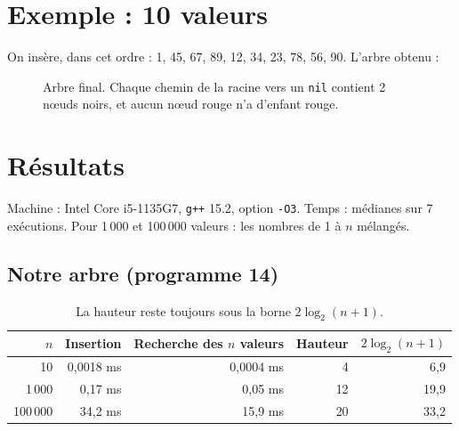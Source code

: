 \documentclass[11pt,a4paper]{article}
\begin{document}
\section{Exemple : 10 valeurs}

On insère, dans cet ordre : 1, 45, 67, 89, 12, 34, 23, 78, 56, 90. L'arbre obtenu :

\begin{figure}[H]
\centering
{}
\caption{Arbre final. Chaque chemin de la racine vers un \texttt{nil} contient 2 nœuds noirs,
et aucun nœud rouge n'a d'enfant rouge.}
\end{figure}

\section{Résultats}

Machine : Intel Core i5-1135G7, \texttt{g++} 15.2, option \texttt{-O3}. Temps : médianes sur
7 exécutions. Pour 1\,000 et 100\,000 valeurs : les nombres de 1 à $n$ mélangés.

\subsection{Notre arbre (programme 14)}

\begin{table}[H]
\centering
\begin{tabular}{|r|r|r|r|r|}
\hline
$n$ & \textbf{Insertion} & \textbf{Recherche des $n$ valeurs} & \textbf{Hauteur} & $2\log_2(n+1)$ \\
\hline
10      & 0,0018 ms & 0,0004 ms & 4  & 6,9 \\
\hline
1\,000  & 0,17 ms    & 0,05 ms    & 12 & 19,9 \\
\hline
100\,000 & 34,2 ms   & 15,9 ms    & 20 & 33,2 \\
\hline
\end{tabular}
\caption{La hauteur reste toujours sous la borne $2\log_2(n+1)$.}
\end{table}
\end{document}
